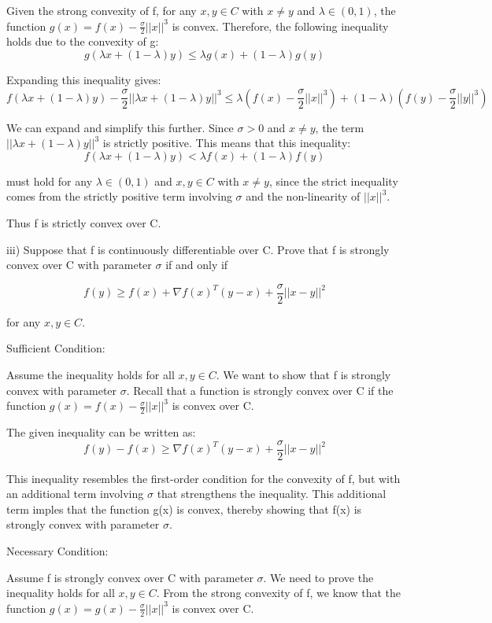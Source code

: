 \documentclass{article}
\begin{document}
Given the strong convexity of f, for any $x, y \in C$ with $x \neq y$
and $\lambda \in (0, 1)$, the function $g(x) = f(x) - \frac{\sigma}{2} ||x||^3$
is convex. Therefore, the following inequality holds due to the convexity of g:
\[g(\lambda x + (1-\lambda)y) \leq \lambda g(x) + (1-\lambda)g(y)\]

Expanding this inequality gives:
\[f(\lambda x + (1-\lambda)y) - \frac{\sigma}{2}||\lambda x + (1-\lambda)y||^3 \leq \lambda (f(x) - \frac{\sigma}{2}||x||^3) + (1-\lambda)(f(y) - \frac{\sigma}{2}||y||^3)\]

We can expand and simplify this further. Since $\sigma > 0$ and $x \neq y$,
the term $||\lambda x + (1-\lambda)y||^3$ is strictly positive.
This means that this inequality:
\[f(\lambda x + (1-\lambda)y) < \lambda f(x) + (1-\lambda)f(y)\]

must hold for any $\lambda \in (0, 1)$ and $x, y \in C$ with $x \neq y$,
since the strict inequality comes from the strictly positive term
involving $\sigma$ and the non-linearity of $||x||^3$.

Thus f is strictly convex over C.


iii) Suppose that f is continuously differentiable over C. Prove that f
is strongly convex over C with parameter $\sigma$ if and only if

\[f(y) \geq f(x) + \nabla f(x)^T (y-x) + \frac{\sigma}{2} ||x-y||^2\]

for any $x, y \in C$.


Sufficient Condition:

Assume the inequality holds for all $x, y \in C$. We want to show that f is strongly
convex with parameter $\sigma$. Recall that a function is strongly convex over
C if the function $g(x) = f(x) - \frac{\sigma}{2} ||x||^3$ is convex over C.

The given inequality can be written as:
\[f(y) - f(x) \geq \nabla f(x)^T (y-x) + \frac{\sigma}{2} ||x-y||^2\]

This inequality resembles the first-order condition for the convexity of f,
but with an additional term involving $\sigma$ that strengthens the inequality.
This additional term imples that the function g(x) is convex,
thereby showing that f(x) is strongly convex with parameter $\sigma$.


Necessary Condition:

Assume f is strongly convex over C with parameter $\sigma$. We need to prove the
inequality holds for all $x, y \in C$. From the strong convexity of f, we
know that the function $g(x) = g(x) - \frac{\sigma}{2} ||x||^3$
is convex over C.
\end{document}
